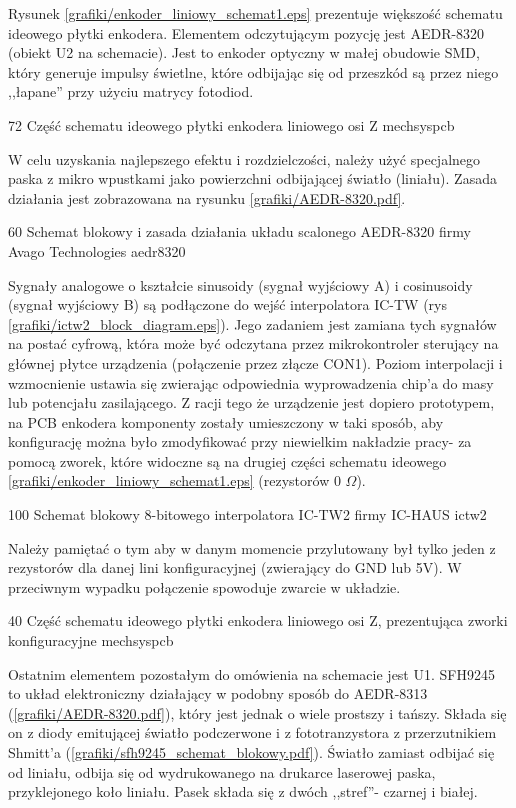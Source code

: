 Rysunek \ref{grafiki/enkoder_liniowy_schemat1.eps} prezentuje większość schematu ideowego płytki enkodera. Elementem odczytującym pozycję jest AEDR-8320 (obiekt U2 na schemacie). Jest to enkoder optyczny w małej obudowie SMD, który generuje impulsy świetlne, które odbijając się od przeszkód są przez niego ,,łapane'' przy użyciu matrycy fotodiod.

	{72}
	{Część schematu ideowego płytki enkodera liniowego osi Z}
	{mechsyspcb}
	
W celu uzyskania najlepszego efektu i rozdzielczości, należy użyć specjalnego paska z mikro wpustkami jako powierzchni odbijającej światło (liniału). Zasada działania jest zobrazowana na rysunku \ref{grafiki/AEDR-8320.pdf}.

	{60}
	{Schemat blokowy i zasada działania układu scalonego AEDR-8320 firmy Avago Technologies}
	{aedr8320}
	
Sygnały analogowe o kształcie sinusoidy (sygnał wyjściowy A) i cosinusoidy (sygnał wyjściowy B) są podłączone do wejść interpolatora IC-TW (rys \ref{grafiki/ictw2_block_diagram.eps}). Jego zadaniem jest zamiana tych sygnałów na postać cyfrową, która może być odczytana przez mikrokontroler sterujący na głównej płytce urządzenia (połączenie przez złącze CON1). Poziom interpolacji i wzmocnienie ustawia się zwierając odpowiednia wyprowadzenia chip'a do masy lub potencjału zasilającego. Z racji tego że urządzenie jest dopiero prototypem, na PCB enkodera komponenty zostały umieszczony w taki sposób, aby konfigurację można było zmodyfikować przy niewielkim nakładzie pracy- za pomocą zworek, które widoczne są na drugiej części schematu ideowego \ref{grafiki/enkoder_liniowy_schemat1.eps} (rezystorów 0 $ \Omega $).

	{100}
	{Schemat blokowy 8-bitowego interpolatora IC-TW2 firmy IC-HAUS}
	{ictw2}
	
Należy pamiętać o tym aby w danym momencie przylutowany był tylko jeden z rezystorów dla danej lini konfiguracyjnej (zwierający do GND lub 5V). W przeciwnym wypadku połączenie spowoduje zwarcie w układzie.

	{40}
	{Część schematu ideowego płytki enkodera liniowego osi Z, prezentująca zworki konfiguracyjne}
	{mechsyspcb}
	
Ostatnim elementem pozostałym do omówienia na schemacie jest U1. SFH9245 to układ elektroniczny działający w podobny sposób do AEDR-8313 (\ref{grafiki/AEDR-8320.pdf}), który jest jednak o wiele prostszy i tańszy. Składa się on z diody emitującej światło podczerwone i z fototranzystora z przerzutnikiem Shmitt'a (\ref{grafiki/sfh9245_schemat_blokowy.pdf}). Światło zamiast odbijać się od liniału, odbija się od wydrukowanego na drukarce laserowej paska, przyklejonego koło liniału. Pasek składa się z dwóch ,,stref''- czarnej i białej.

